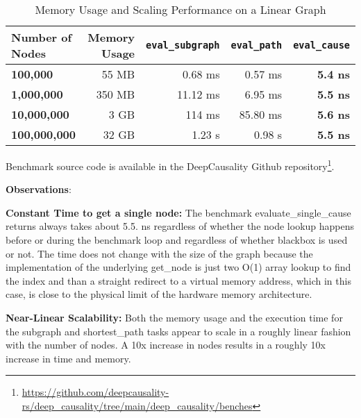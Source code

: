 \begin{table}[h!]
\centering
\caption{Memory Usage and Scaling Performance on a Linear Graph}
\label{tab:memory-scaling}
\begin{tabular}{lrrrr}
\toprule
\textbf{Number of Nodes} & \textbf{Memory Usage} & \textbf{\texttt{eval\_subgraph}} & \textbf{\texttt{eval\_path}} & \textbf{\texttt{eval\_cause}} \\
\midrule
\textbf{100,000}         & 55 MB                 & 0.68 ms                         & 0.57 ms                      & \textbf{5.4 ns}               \\
\textbf{1,000,000}       & 350 MB                & 11.12 ms                        & 6.95 ms                      & \textbf{5.5 ns}               \\
\textbf{10,000,000}      & 3 GB                  & 114 ms                          & 85.80 ms                     & \textbf{5.6 ns}               \\
\textbf{100,000,000}     & 32 GB                 & 1.23 s                          & 0.98 s                       & \textbf{5.5 ns}               \\
\bottomrule
\end{tabular}
\end{table}

Benchmark source code is available in the DeepCausality Github repository\footnote{\url{https://github.com/deepcausality-rs/deep_causality/tree/main/deep_causality/benches}}.

\textbf{Observations}:

\textbf{Constant Time to get a single node:} The benchmark evaluate\_single\_cause returns always takes about 5.5. ns regardless of
 whether the node lookup happens before or during the benchmark loop and regardless of whether blackbox is used or not. 
 The time does not change with the size of the graph because the implementation of the underlying get\_node is just two O(1) array lookup 
 to find the index and than a straight redirect to a virtual memory address, which in this case, is close to the physical limit of the hardware memory architecture. 


\textbf{Near-Linear Scalability:} Both the memory usage and the execution time for the subgraph and shortest\_path tasks appear to scale in a roughly linear fashion with the number of nodes. 
A 10x increase in nodes results in a roughly 10x increase in time and memory. 

